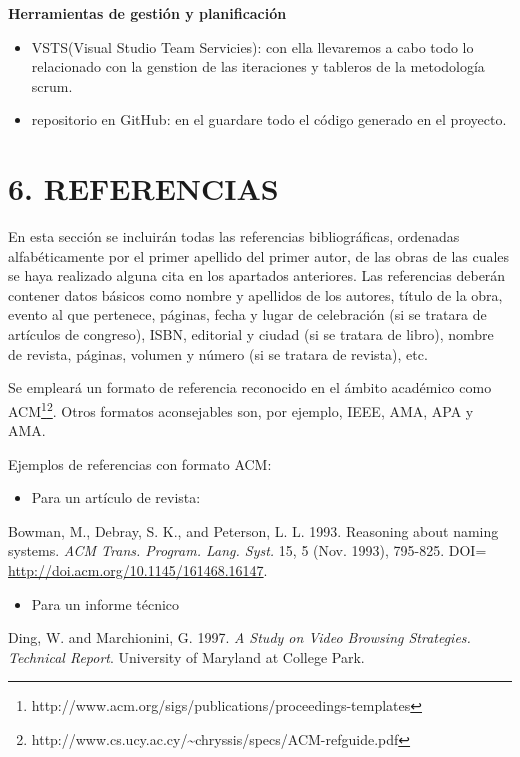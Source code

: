 \documentclass[a4paper]{article}
\newcommand\liststyleLi{%
\renewcommand\labelitemi{{\textbullet}}
\renewcommand\labelitemii{${\circ}$}%
\renewcommand\labelitemiii{${\blacksquare}$}
\renewcommand\labelitemiv{{\textbullet}}
}
\newcommand\liststyleLii{%
\renewcommand\labelitemi{{\textbullet}}
\renewcommand\labelitemii{${\circ}$}
\renewcommand\labelitemiii{${\blacksquare}$}
\renewcommand\labelitemiv{{\textbullet}}
}
\begin{document}
\textbf{Herramientas de gestión y planificación}
\begin{itemize}
\item VSTS(Visual Studio Team Servicies): con ella llevaremos a cabo todo lo relacionado con la genstion de las iteraciones y tableros de la metodología scrum.
\item repositorio en GitHub: en el guardare todo el código generado en el proyecto.
\end{itemize}


\section[6. REFERENCIAS]{6. REFERENCIAS}
En esta secci\'on se incluir\'an todas las referencias bibliogr\'aficas, ordenadas alfab\'eticamente por el primer
apellido del primer autor, de las obras de las cuales se haya realizado alguna cita en los apartados anteriores. Las
referencias deber\'an contener datos b\'asicos como nombre y apellidos de los autores, t\'itulo de la obra, evento al
que pertenece, p\'aginas, fecha y lugar de celebraci\'on (si se tratara de art\'iculos de congreso), ISBN, editorial y
ciudad (si se tratara de libro), nombre de revista, p\'aginas, volumen y n\'umero (si se tratara de revista), etc.

Se emplear\'a un formato de referencia reconocido en el \'ambito acad\'emico como
ACM\footnote{http://www.acm.org/sigs/publications/proceedings-templates}\footnote{http://www.cs.ucy.ac.cy/\~{}chryssis/specs/ACM-refguide.pdf}.
Otros formatos aconsejables son, por ejemplo, IEEE, AMA, APA y AMA.

Ejemplos de referencias con formato ACM:

\liststyleLi
\begin{itemize}
\item Para un art\'iculo de revista:
\end{itemize}
Bowman, M., Debray, S. K., and Peterson, L. L. 1993. Reasoning about naming systems. \textit{ACM Trans. Program. Lang.
Syst.} 15, 5 (Nov. 1993), 795-825. DOI= \url{http://doi.acm.org/10.1145/161468.16147}.

\liststyleLii
\begin{itemize}
\item Para un informe t\'ecnico
\end{itemize}
Ding, W. and Marchionini, G. 1997. \textit{A Study on Video Browsing Strategies. Technical Report}. University of
Maryland at College Park.
\end{document}
